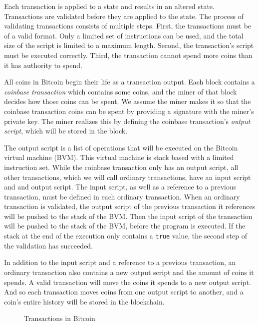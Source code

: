 Each transaction is applied to a state and results in an altered state. Transactions are validated before they are applied to the state. The process of validating transactions consists of multiple steps. First, the transactions must be of a valid format. Only a limited set of instructions can be used, and the total size of the script is limited to a maximum length. Second, the transaction's script must be executed correctly. Third, the transaction cannot spend more coins than it has authority to spend.

All coins in Bitcoin begin their life as a transaction output. Each block contains a \emph{coinbase transaction} which contains some coins, and the miner of that block decides how those coins can be spent. We assume the miner makes it so that the coinbase transaction coins can be spent by providing a signature with the miner's private key. The miner realizes this by defining the coinbase transaction's \emph{output script}, which will be stored in the block. 

The output script is a list of operations that will be executed on the Bitcoin virtual machine (BVM). This virtual machine is stack based with a limited instruction set. While the coinbase transaction only has an output script, all other transactions, which we will call ordinary transactions, have an input script and and output script. The input script, as well as a reference to a previous transaction, must be defined in each ordinary transaction. When an ordinary transaction is validated, the output script of the previous transaction it references will be pushed to the stack of the BVM. Then the input script of the transaction will be pushed to the stack of the BVM, before the program is executed. If the stack at the end of the execution only contains a \texttt{true} value, the second step of the validation has succeeded. 

In addition to the input script and a reference to a previous transaction, an ordinary transaction also contains a new output script and the amount of coins it spends. A valid transaction will move the coins it spends to a new output script. And so each transaction moves coins from one output script to another, and a coin's entire history will be stored in the blockchain. 

\begin{figure}[htbp]
  \centering
  
  \caption{Transactions in Bitcoin}
\end{figure}

